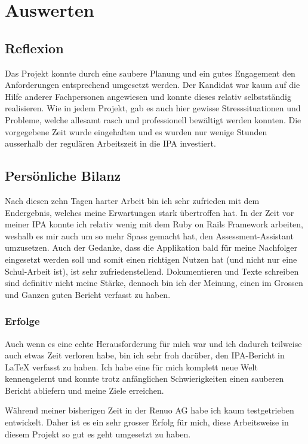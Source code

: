 \chapter{Auswerten}

\section{Reflexion}

Das Projekt konnte durch eine saubere Planung und ein gutes Engagement den Anforderungen entsprechend umgesetzt werden.
Der Kandidat war kaum auf die Hilfe anderer Fachpersonen angewiesen und konnte dieses relativ selbstständig realisieren. 
 Wie in jedem Projekt, gab es auch hier gewisse Stresssituationen und Probleme, welche allesamt rasch und professionell bewältigt werden konnten. Die vorgegebene Zeit wurde eingehalten und es wurden nur wenige Stunden ausserhalb der regulären Arbeitszeit in die IPA investiert.

\section{Persönliche Bilanz}

Nach diesen zehn Tagen harter Arbeit bin ich sehr zufrieden mit dem Endergebnis, welches meine Erwartungen stark übertroffen hat.
In der Zeit vor meiner IPA konnte ich relativ wenig mit dem Ruby on Rails Framework arbeiten, weshalb es mir auch um so mehr Spass gemacht hat,
den Assessment-Assistant umzusetzen. Auch der Gedanke, dass die Applikation bald für meine Nachfolger eingesetzt werden soll und somit einen richtigen
Nutzen hat (und nicht nur eine Schul-Arbeit ist), ist sehr zufriedenstellend. Dokumentieren und Texte schreiben sind definitiv nicht meine Stärke, dennoch bin ich der Meinung, einen
im Grossen und Ganzen guten Bericht verfasst zu haben.

\subsection{Erfolge}
Auch wenn es eine echte Herausforderung für mich war und ich dadurch teilweise auch etwas Zeit verloren habe, bin ich 
sehr froh darüber, den IPA-Bericht in LaTeX verfasst zu haben. Ich habe eine für mich komplett neue Welt kennengelernt und konnte trotz anfänglichen Schwierigkeiten
einen sauberen Bericht abliefern und meine Ziele erreichen.

Während meiner bisherigen Zeit in der Renuo AG habe ich kaum testgetrieben entwickelt. Daher ist es ein sehr grosser Erfolg für mich, 
diese Arbeitsweise in diesem Projekt so gut es geht umgesetzt zu haben.

